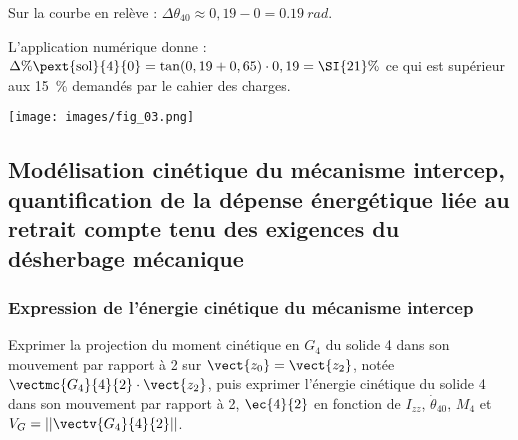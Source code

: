 \documentclass[11pt]{article}
\begin{document}
\begin{UPSTIcorrige}
\begin{minipage}{0.55\textwidth}
Sur la courbe en relève  : $\Delta \theta_{40} \approx 0,19-0 =\SI{0,19}{rad}$.

%
%
%

L'application numérique donne : 
$\Delta \% \pext{\text{sol}}{4}{0}=\tan(0,19+0,65)\cdot 0,19 =\SI{21}{\%}$ ce qui est supérieur aux 15\, \% demandés par le cahier des charges.
\end{minipage}
\begin{minipage}{0.4\textwidth}
\begin{center}
\texttt{[image: images/fig\_03.png]}
\end{center}
\end{minipage}



 
\end{UPSTIcorrige}

\subsection{Modélisation cinétique du mécanisme intercep, quantification de la dépense énergétique
liée au retrait compte tenu des exigences du désherbage mécanique}


\subsubsection{Expression de l’énergie cinétique du mécanisme intercep}


\UPSTIquestion  Exprimer la projection du moment cinétique en $G_4$ du solide 4 dans son mouvement par rapport à 2
sur $\vect{z_0}=\vect{z_2}$, notée $\vectmc{G_4}{4}{2}\cdot\vect{z_2}$, puis exprimer l’énergie cinétique du solide 4 dans son mouvement par rapport à 2, $\ec{4}{2}$ en fonction de $I_{zz}$, $\dot{\theta}_{40}$, $M_4$ et $V_G = \left|\left| \vectv{G_4}{4}{2} \right|\right|$.
\end{document}
